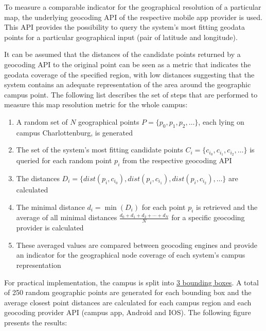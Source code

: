 To measure a comparable indicator for the geographical resolution of a particular map, the underlying geocoding API of the respective mobile app provider is used. This API provides the possibility to query the system's most fitting geodata points for a particular geographical input (pair of latitude and longitude).

It can be assumed that the distances of the candidate points returned by a geocoding API to the original point can be seen as a metric that indicates the geodata coverage of the specified region, with low distances suggesting that the system contains an adequate representation of the area around the geographic campus point. The following list describes the set of steps that are performed to measure this map resolution metric for the whole campus:

\newpage

\begin{enumerate}
    \item A random set of $N$ geographical points $P = \{p_{0}, p_{1}, p_{2}, \ldots\}$, each lying on campus Charlottenburg, is generated
    \item The set of the system's most fitting candidate points $C_{i} = \{c_{i_{0}}, c_{i_{1}}, c_{i_{2}}, \ldots\}$ is queried for each random point $p_{i}$ from the respective geocoding API
    \item The distances $D_{i} = \{dist(p_{i}, c_{i_{0}}), dist(p_{i}, c_{i_{1}}), dist(p_{i}, c_{i_{2}}), \ldots\}$ are calculated
    \item The minimal distance $d_{i} = \min(D_{i})$ for each point $p_{i}$ is retrieved and the average of all minimal distances $\frac{d_{0} + d_{1} + d_{2} + \cdots + d_{N}}{N}$ for a specific geocoding provider is calculated
    \item These averaged values are compared between geocoding engines and provide an indicator for the geographical node coverage of each system's campus representation
\end{enumerate}

\vspace{2mm}

For practical implementation, the campus is split into \hyperref[table:campus_regions]{3 bounding boxes}. A total of 250 random geographic points are generated for each bounding box and the average closest point distances are calculated for each campus region and each geocoding provider API (campus app, Android and IOS). The following figure presents the results:


